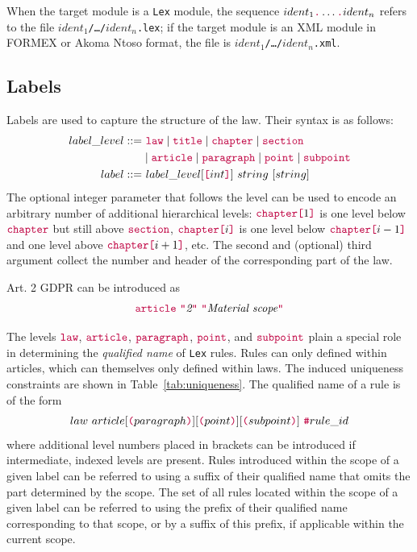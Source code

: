 \documentclass[runningheads]{llncs}
\newcommand{\Lex}{\texttt{Lex}}
\newcommand{\kw}[1]{{\color{purple}\texttt{#1}}}
\begin{document}
When the target module is a \Lex{} module, the sequence $ident_1\kw{.}\dots\kw{.} ident_n$ refers
to the file \texttt{$ident_1$/\dots/$ident_n$.lex}; if the target module is an XML module in
FORMEX or Akoma Ntoso format, the file is \texttt{$ident_1$/\dots/$ident_n$.xml}.

\subsection{Labels}

Labels are used to capture the structure of the law. Their syntax is as follows:
\begin{align*}
  label\_level::=&~ \kw{law}\mid \kw{title} \mid \kw{chapter} \mid \kw{section} \\
              &\mid \kw{article} \mid \kw{paragraph} \mid \kw{point} \mid \kw{subpoint}\\
  label ::=&~ label\_level[\kw{[} int\kw{]}]~string~[string]
\end{align*}
The optional integer parameter that follows the level can be used to encode an arbitrary number
of additional hierarchical levels: $\kw{chapter}\kw{[}1\kw{]}$ is one level below $\kw{chapter}$
but still above $\kw{section}$, $\kw{chapter}\kw{[}i\kw{]}$ is one level below
$\kw{chapter}\kw{[}i-1\kw{]}$ and one level above $\kw{chapter}\kw{[}i+1\kw{]}$, etc. The second
and (optional) third argument collect the number and header of the corresponding part of the law.

\begin{example}
  Art. 2 GDPR can be introduced as
  \begin{align*}
    \kw{article}~\kw{"}\text{\itshape 2}\kw{"}~\kw{"}\text{\itshape Material scope}\kw{"}
  \end{align*}
\end{example}

The levels $\kw{law}$, $\kw{article}$, $\kw{paragraph}$, $\kw{point}$, and $\kw{subpoint}$ plain
a special role in determining the \emph{qualified name} of \Lex{} rules. Rules can only defined
within articles, which can themselves only defined within laws. The induced uniqueness
constraints are shown in Table~\ref{tab:uniqueness}. The qualified name of a rule is of the
form
$$law~article[\kw{(}paragraph\kw{)}][\kw{(}point\kw{)}][\kw{(}subpoint\kw{)}]~\kw{\#}rule\_id$$
where additional level numbers placed in brackets can be introduced if intermediate,
indexed levels are present. Rules introduced within the scope of a given label can
be referred to using a suffix of their qualified name that omits the part determined by the
scope. The set of all rules located within the scope of a given label can be referred to using the
prefix of their qualified name corresponding to that scope, or by a suffix of this prefix,
if applicable within the current scope.
\end{document}
